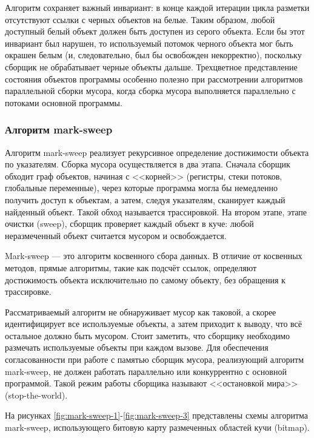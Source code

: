 Алгоритм сохраняет важный инвариант: в конце каждой итерации цикла разметки отсутствуют ссылки с черных объектов на белые. Таким образом, любой доступный белый объект должен быть доступен из серого объекта. Если бы этот инвариант был нарушен, то используемый потомок черного объекта мог быть окрашен белым (и, следовательно, был бы освобожден некорректно), поскольку сборщик не обрабатывает черные объекты дальше. Трехцветное представление состояния объектов программы особенно полезно при рассмотрении алгоритмов параллельной сборки мусора, когда сборка мусора выполняется параллельно с потоками основной программы. \cite{handbook}



\subsubsection{Алгоритм mark-sweep}

Алгоритм mark-sweep реализует рекурсивное определение достижимости объекта по указателям. Сборка мусора осуществляется в два этапа. Сначала сборщик обходит граф объектов, начиная с <<корней>> (регистры, стеки потоков, глобальные переменные), через которые программа могла бы немедленно получить доступ к объектам, а затем, следуя указателям, сканирует каждый найденный объект. Такой обход называется трассировкой. На втором этапе, этапе очистки (sweep), сборщик проверяет каждый объект в куче: любой неразмеченный объект считается мусором и освобождается. \cite{handbook}

Mark-sweep --- это алгоритм косвенного сбора данных. В отличие от косвенных методов, прямые алгоритмы, такие как подсчёт ссылок, определяют достижимость объекта исключительно по самому объекту, без обращения к трассировке.  \cite{handbook}

Рассматриваемый алгоритм не обнаруживает мусор как таковой, а скорее идентифицирует все используемые объекты, а затем приходит к выводу, что всё остальное должно быть мусором. Стоит заметить, что сборщику необходимо размечать используемые объекты при каждом вызове. Для обеспечения согласованности при работе с памятью сборщик мусора, реализующий алгоритм mark-sweep, не должен работать параллельно или конкуррентно с основной программой. Такой режим работы сборщика называют <<остановкой мира>> (stop-the-world). \cite{handbook}

На рисунках \ref{fig:mark-sweep-1}-\ref{fig:mark-sweep-3} представлены схемы алгоритма mark-sweep, использующего битовую карту размеченных областей кучи (bitmap). \cite{handbook}

